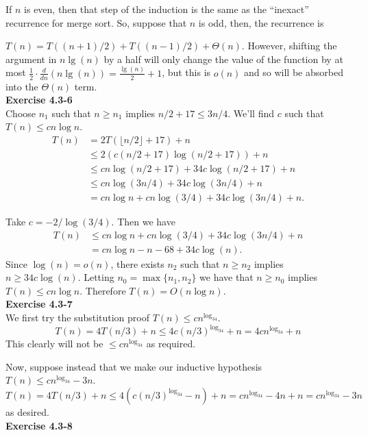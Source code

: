\documentclass{article}
\begin{document}
If $n$ is even, then that step of the induction is the same as the ``inexact'' recurrence for merge sort. So, suppose that $n$ is odd, then, the recurrence is 

$T(n) = T((n+1)/2) + T((n-1)/2) + \Theta(n)$. However, shifting the argument in $n\lg(n)$ by a half will only change the value of the function by at most $\frac{1}{2}\cdot \frac{d}{dn}( n\lg(n)) = \frac{\lg(n)}{2} + 1$, but this is $o(n)$ and so will be absorbed into the $\Theta(n)$ term.\\

\noindent\textbf{Exercise 4.3-6}\\

Choose $n_1$ such that $n \geq n_1$ implies $n/2 + 17 \leq 3n/4$.  We'll find $c$ such that $T(n) \leq cn\log n$.
\begin{align*}
T(n) &= 2T(\lfloor n/2 \rfloor + 17) + n \\
&\leq 2(c(n/2 + 17)\log(n/2 + 17)) + n \\
&\leq cn\log(n/2 + 17) + 34c\log(n/2 + 17)+ n \\
&\leq cn\log(3n/4) + 34c\log(3n/4) + n\\
&= cn\log n +cn\log(3/4) + 34c\log(3n/4) + n.
\end{align*}

Take $c = -2/\log(3/4)$.  Then we have 
\begin{align*}
T(n) & \leq cn\log n +cn\log(3/4) + 34c\log(3n/4) + n \\
&= cn\log n -n - 68 + 34c\log(n).
\end{align*}
Since $\log(n) = o(n)$, there exists $n_2$ such that $n \geq n_2$ implies $n \geq 34c\log(n)$.  Letting $n_0 = \max\{n_1, n_2\}$ we have that $n \geq n_0$ implies $T(n) \leq cn\log n $.  Therefore $T(n) = O(n \log n)$. \\

\noindent\textbf{Exercise 4.3-7}\\

We first try the substitution proof $T(n) \le cn^{\log_34}$.
\[
T(n) = 4T(n/3)+n \le 4 c(n/3)^{\log_34}+n = 4cn^{\log_34}+n
\]
This clearly will not be $\le cn^{\log_34}$ as required.

Now, suppose instead that we make our inductive hypothesis $T(n) \le cn^{\log_34} -3n$.
\[
T(n) = 4T(n/3)+n \le 4(c(n/3)^{\log_34}-n) +n = cn^{\log_34} - 4n + n =cn^{\log_34} - 3n 
\]
as desired.\\


\noindent\textbf{Exercise 4.3-8} \\
\end{document}
